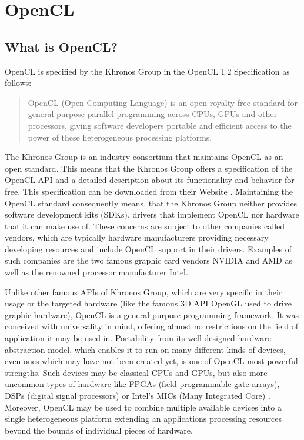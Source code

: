 \chapter{OpenCL}
\label{sec:opencl}

\section{What is OpenCL?}
OpenCL is specified by the Khronos Group in the OpenCL 1.2 Specification as follows:

\begin{quote}
OpenCL (Open Computing Language) is an open royalty-free standard for general purpose
parallel programming across CPUs, GPUs and other processors, giving software developers
portable and efficient access to the power of these heterogeneous processing platforms. \cite{opencl_spec}
\end{quote}

The Khronos Group is an industry consortium that maintains OpenCL as an open standard. This means that the Khronos Group offers a specification of the OpenCL API and a detailed description about its functionality and behavior for free. This specification can be downloaded from their Website \cite{opencl_spec}. Maintaining the OpenCL standard consequently means, that the Khronos Group neither provides software development kits (SDKs), drivers that implement OpenCL nor hardware that it can make use of. These concerns are subject to other companies called vendors, which are typically hardware manufacturers providing necessary developing resources and include OpenCL support in their drivers. Examples of such companies are the two famous graphic card vendors NVIDIA and AMD as well as the renowned processor manufacturer Intel.

Unlike other famous APIs of Khronos Group, which are very specific in their usage or the targeted hardware (like the famous 3D API OpenGL used to drive graphic hardware), OpenCL is a general purpose programming framework. It was conceived with universality in mind, offering almost no restrictions on the field of application it may be used in. Portability from its well designed hardware abstraction model, which enables it to run on many different kinds of devices, even ones which may have not been created yet, is one of OpenCL most powerful strengths. Such devices may be classical CPUs and GPUs, but also more uncommon types of hardware like FPGAs (field programmable gate arrays), DSPs (digital signal processors) or Intel's MICs (Many Integrated Core) \cite{mic}. Moreover, OpenCL may be used to combine multiple available devices into a single heterogeneous platform extending an applications processing resources beyond the bounds of individual pieces of hardware.

